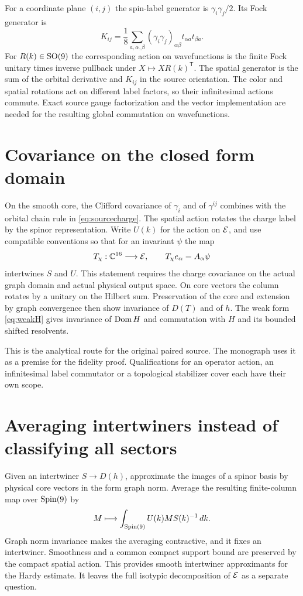 For a coordinate plane $(i,j)$ the spin-label generator is $\gamma_i\gamma_j/2$. Its Fock generator is
\[
 K_{ij}=\frac18\sum_{a,\alpha,\beta}
            (\gamma_i\gamma_j)_{\alpha\beta}t_{\alpha a}t_{\beta a}.
\]
For $R(k)\in\operatorname{SO}(9)$ the corresponding action on wavefunctions is the finite Fock unitary times inverse pullback under $X\mapsto XR(k)^{\mathsf T}$. The spatial generator is the sum of the orbital derivative and $K_{ij}$ in the source orientation. The color and spatial rotations act on different label factors, so their infinitesimal actions commute. Exact source gauge factorization and the vector implementation are needed for the resulting global commutation on wavefunctions.

\section{Covariance on the closed form domain}
On the smooth core, the Clifford covariance of $\gamma_i$ and of $\gamma^{ij}$ combines with the orbital chain rule in \eqref{eq:sourcecharge}. The spatial action rotates the charge label by the spinor representation. Write $U(k)$ for the action on $\mathcal E$, and use compatible conventions so that for an invariant $\psi$ the map
\begin{equation}
 T_\chi:\mathbb C^{16}\longrightarrow \mathcal E,\qquad
            T_\chi e_\alpha=A_\alpha\psi                         \label{eq:chi}
\end{equation}
intertwines $S$ and $U$. This statement requires the charge covariance on the actual graph domain and actual physical output space. On core vectors the column rotates by a unitary on the Hilbert sum. Preservation of the core and extension by graph convergence then show invariance of $D(T)$ and of $h$. The weak form \eqref{eq:weakH} gives invariance of $\operatorname{Dom} H$ and commutation with $H$ and its bounded shifted resolvents.

This is the analytical route for the original paired source. The monograph uses it as a premise for the fidelity proof. Qualifications for an operator action, an infinitesimal label commutator or a topological stabilizer cover each have their own scope.

\section{Averaging intertwiners instead of classifying all sectors}
Given an intertwiner $S\to D(h)$, approximate the images of a spinor basis by physical core vectors in the form graph norm. Average the resulting finite-column map over $\operatorname{Spin}(9)$ by
\[
 M\longmapsto \int_{\operatorname{Spin}(9)} U(k) M S(k)^{-1}\,dk .
\]
Graph norm invariance makes the averaging contractive, and it fixes an intertwiner. Smoothness and a common compact support bound are preserved by the compact spatial action. This provides smooth intertwiner approximants for the Hardy estimate. It leaves the full isotypic decomposition of $\mathcal E$ as a separate question.
